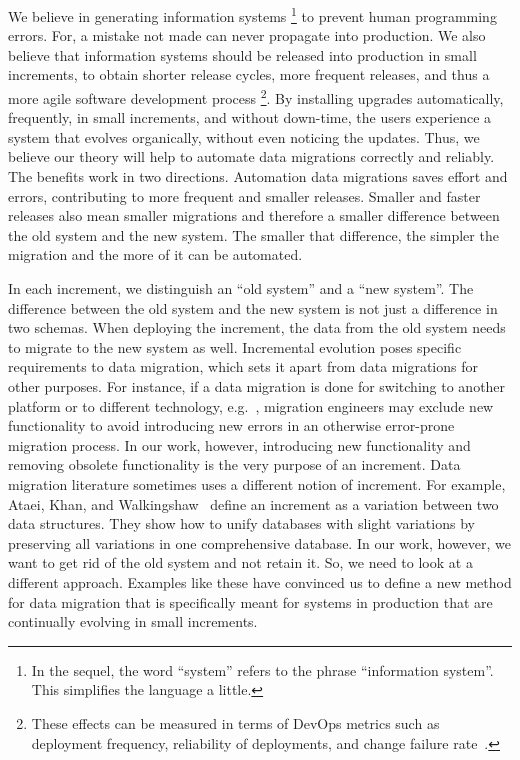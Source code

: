 \documentclass{elsarticle}
\begin{document}
   We believe in generating information systems%
\footnote{In the sequel, the word ``system'' refers to the phrase ``information system''. This simplifies the language a little. }
   to prevent human programming errors.
   For, a mistake not made can never propagate into production.
   We also believe that information systems should be released into production in small increments,
   to obtain shorter release cycles, more frequent releases, and thus a more agile software development process%
   \footnote{These effects can be measured in terms of DevOps metrics such as
   deployment frequency,
   reliability of deployments, and
   change failure rate~\cite{DevOps2021}.}.
   By installing upgrades automatically, frequently, in small increments, and without down-time,
   the users experience a system that evolves organically, without even noticing the updates.
   Thus, we believe our theory will help to automate data migrations correctly and reliably.
   The benefits work in two directions.
   Automation data migrations saves effort and errors,
   contributing to more frequent and smaller releases.
   Smaller and faster releases also mean smaller migrations
   and therefore a smaller difference between the old system and the new system.
   The smaller that difference, the simpler the migration and the more of it can be automated.

   In each increment, we distinguish an ``old system'' and a ``new system''.
   The difference between the old system and the new system is not just a difference in two schemas.
   When deploying the increment, the data from the old system needs to migrate to the new system as well.
   Incremental evolution poses specific requirements to data migration,
   which sets it apart from data migrations for other purposes.
   For instance, if a data migration is done for switching to another platform or to different technology,
   e.g.~\cite{Gholami2016,Bisbal1999},
   migration engineers may exclude new functionality to avoid introducing new errors in an otherwise error-prone migration process.
   In our work, however, introducing new functionality and removing obsolete functionality is the very purpose of an increment.
   Data migration literature sometimes uses a different notion of increment.
   For example, Ataei, Khan, and Walkingshaw~\cite{Ataei2021,Walkingshaw2014} define an increment as a variation between two data structures.
   They show how to unify databases with slight variations by preserving all variations in one comprehensive database.
   In our work, however, we want to get rid of the old system and not retain it.
   So, we need to look at a different approach.
   Examples like these have convinced us to define a new method for data migration that is specifically meant for systems in production that are
   continually evolving in small increments.
   
\end{document}
